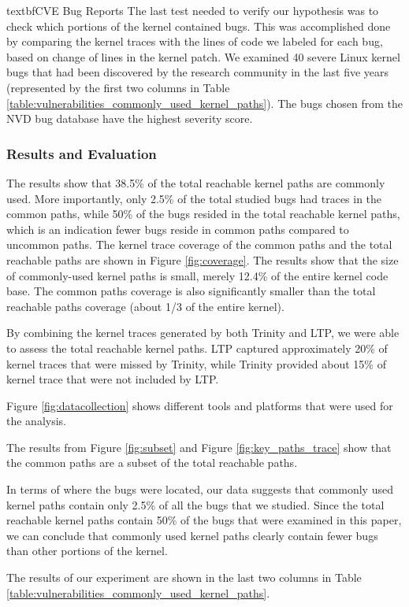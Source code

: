 textbf{CVE Bug Reports}
The last test needed to verify our hypothesis was to check which portions of
the kernel contained bugs. This was accomplished done by comparing the kernel
traces with the lines of code we labeled for each bug, based on change of lines in the
kernel patch. We examined 40 severe Linux kernel
bugs that had been discovered by the research community in the last five
years (represented by the first two columns in Table
\ref{table:vulnerabilities_commonly_used_kernel_paths}).
The bugs chosen from the NVD bug database have the highest severity score.

\subsubsection{Results and Evaluation}
The results show that 38.5\% of the total reachable kernel paths are commonly
used. More importantly, only 2.5\% of the total studied bugs had traces
in the common paths, while 50\% of the bugs resided in the total reachable
kernel paths, which is an indication fewer bugs reside in common paths
compared to uncommon paths. The kernel trace coverage of the common paths and
the total reachable paths are shown in Figure \ref{fig:coverage}.
The results show that the size of commonly-used kernel paths is small,
merely 12.4\% of the entire kernel code base.
The common paths coverage is also significantly smaller than
the total reachable paths coverage (about 1/3 of the entire kernel).

By combining the kernel traces generated by both Trinity and LTP, we were able
to assess the total reachable kernel paths. LTP captured approximately 20\% of kernel
traces that were missed by Trinity, while Trinity
provided about 15\% of kernel trace that were not included by LTP.

 Figure \ref{fig:datacollection} shows different tools and platforms that were used
  for the analysis.

The results from Figure \ref{fig:subset} and Figure \ref{fig:key_paths_trace}
show that the common paths are a subset of the
total reachable paths.

In terms of where the bugs were located, our data suggests that
commonly used kernel paths
contain only 2.5\% of all the bugs that we studied.
Since the total reachable kernel paths contain 50\% of the bugs that were
examined in this paper, we can conclude
that commonly used kernel paths clearly contain fewer bugs than other
portions of the kernel.

The results of our experiment are shown in the last two columns in
 Table \ref{table:vulnerabilities_commonly_used_kernel_paths}.

